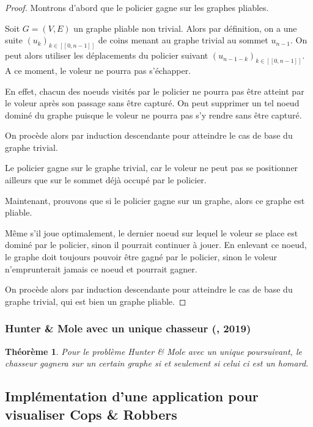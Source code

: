 \documentclass[12pt]{article}
\newtheorem{theoreme}{Théorème}
\newcommand{\inN}[2]{\in[\![#1,#2]\!]}
\newcommand{\cp}{Cops \& Robbers\xspace}
\newcommand{\hm}{Hunter \& Mole\xspace}
\begin{document}
\begin{proof}
\boxed{\Leftarrow} Montrons d'abord que le policier gagne sur les graphes pliables.

Soit $G = (V,E)$ un graphe pliable non trivial. Alors par définition, on a une suite $(u_k)_{k\inN{0}{n-1}}$ de coins menant au graphe trivial au sommet $u_{n-1}$. On peut alors utiliser les déplacements du policier suivant $(u_{n-1-k})_{k\inN{0}{n-1}}$. A ce moment, le voleur ne pourra pas s'échapper.

En effet, chacun des noeuds visités par le policier ne pourra pas être atteint par le voleur après son passage sans être capturé. On peut supprimer un tel noeud dominé du graphe puisque le voleur ne pourra pas s'y rendre sans être capturé. 

On procède alors par induction descendante pour atteindre le cas de base du graphe trivial.

Le policier gagne sur le graphe trivial, car le voleur ne peut pas se positionner ailleurs que sur le sommet déjà occupé par le policier.

\boxed{\Rightarrow} Maintenant, prouvons que si le policier gagne sur un graphe, alors ce graphe est pliable.

Même s'il joue optimalement, le dernier noeud sur lequel le voleur se place est dominé par le policier, sinon il pourrait continuer à jouer. En enlevant ce noeud, le graphe doit toujours pouvoir être gagné par le policier, sinon le voleur n'emprunterait jamais ce noeud et pourrait gagner. 

On procède alors par induction descendante pour atteindre le cas de base du graphe trivial, qui est bien un graphe pliable.
\end{proof}

\subsubsection{\hm avec un unique chasseur (\cite{komarov2013hunter}, 2019)}

\begin{theoreme}
    Pour le problème \hm avec un unique poursuivant, le chasseur gagnera sur un certain graphe si et seulement si celui ci est un homard.
\end{theoreme}

\subsection{Implémentation d'une application pour visualiser \cp}
\end{document}
